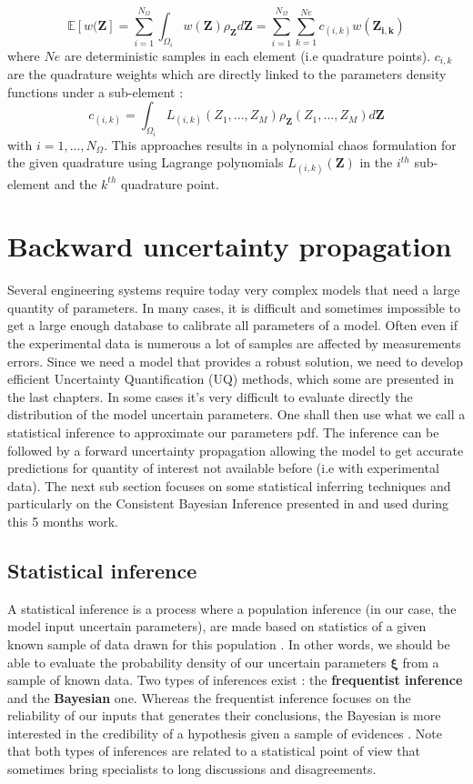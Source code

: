 \documentclass[11pt, a4paper, English]{report}
\begin{document}
$$\mathbb{E}[w(\boldsymbol{Z}] = \sum_{i=1}^{N_\Omega}\int_{\Omega_i} w(\boldsymbol{Z})\rho_{\boldsymbol{Z}}d\boldsymbol{Z} = \sum_{i=1}^{N_\Omega}\sum_{k=1}^{Ne}c_{(i,k)}w(\boldsymbol{Z_{i,k}})$$
where $Ne$ are deterministic samples in each element (i.e quadrature points). $c_{i,k}$ are the quadrature weights which are directly linked to the parameters density functions under a sub-element :
$$c_{(i,k)}=\int_{\Omega_i} L_{(i,k)}(Z_1,...,Z_M)\rho_{\boldsymbol{Z}}(Z_1,...,Z_M)d\boldsymbol{Z}  $$
with $i=1,...,N_\Omega$. This approaches results in a polynomial chaos formulation for the given quadrature using Lagrange polynomials $L_{(i,k)}(\boldsymbol{Z})$ in the $i^{th}$ sub-element and the $k^{th}$ quadrature point. 

\color{blue!40!black}\chapter{Backward uncertainty propagation}\color{black}

Several engineering systems require today very complex models that need a large quantity of parameters. In many cases, it is difficult and sometimes impossible to get a large enough database to calibrate all parameters of a model. Often even if the experimental data is numerous a lot of samples are affected by measurements errors. Since we need a model that provides a robust solution, we need to develop efficient Uncertainty Quantification (UQ) methods, which some are presented in the last chapters. In some cases it's very difficult to evaluate directly the distribution of the model uncertain parameters. One shall then use what we call a statistical inference to approximate our parameters pdf. The inference can be followed by a forward uncertainty propagation allowing the model to get accurate predictions for quantity of interest not available before (i.e with experimental data). The next sub section focuses on some statistical inferring techniques and particularly on the Consistent Bayesian Inference presented in \cite{Tim1} and used during this 5 months work.
\section{Statistical inference}
A statistical inference is a process where a population inference (in our case, the model input uncertain parameters), are made based on statistics of a given known sample of data drawn for this population \cite{defInf}. In other words, we should be able to evaluate the probability density of our uncertain parameters $\boldsymbol{\xi}$ from a sample of known data. Two types of inferences exist : the \textbf{frequentist inference} and the \textbf{Bayesian} one. Whereas the frequentist inference focuses on the reliability of our inputs that generates their conclusions, the Bayesian is more interested in the credibility of a hypothesis given a sample of evidences \cite{statInf}. Note that both types of inferences are related to a statistical point of view that sometimes bring specialists to long discussions and disagreements.
\end{document}
